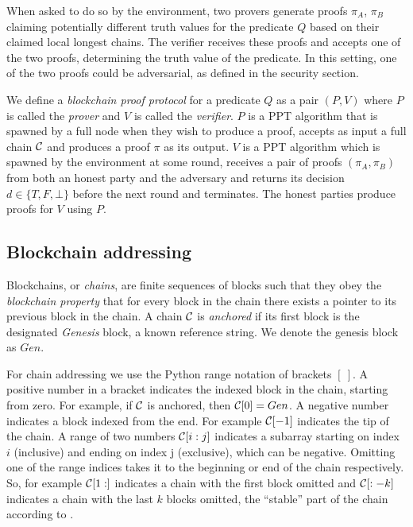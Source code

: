 When asked to do so by the environment, two provers generate proofs $\pi_A$,
$\pi_B$ claiming potentially different truth values for the predicate $Q$ based
on their claimed local longest chains. The verifier receives these proofs and
accepts one of the two proofs, determining the truth value of the predicate. In
this setting, one of the two proofs could be adversarial, as defined in the
security section.

We define a \textit{blockchain proof protocol} for a predicate $Q$ as a pair
$(P, V)$ where $P$ is called the \textit{prover} and $V$ is called the
\textit{verifier}. $P$ is a PPT algorithm that is spawned by a full node
when they wish to produce a proof, accepts as input a full chain $\mathcal{C}$ and
produces a proof $\pi$ as its output. $V$ is a PPT algorithm which is spawned
by the environment at some round, receives a pair of proofs $(\pi_A, \pi_B)$
from both an honest party and the adversary and returns its decision $d \in \{T,
F, \bot\}$ before the next round and terminates. The honest parties produce
proofs for $V$ using $P$.

\subsection{Blockchain addressing}

Blockchains, or \textit{chains}, are finite sequences of blocks such that they
obey the \textit{blockchain property} that for every block in the chain there
exists a pointer to its previous block in the chain. A chain $\mathcal{C}$ is
\textit{anchored} if its first block is the designated \textit{Genesis} block, a
known reference string. We denote the genesis block as $Gen$.

For chain addressing we use the Python range notation of brackets $[~]$. A
positive number in a bracket indicates the indexed block in the chain, starting
from zero. For example, if $\mathcal{C}$ is anchored, then $\mathcal{C}[0] = Gen$. A
negative number indicates a block indexed from the end.  For example
$\mathcal{C}[-1]$ indicates the tip of the chain. A range of two numbers
$\mathcal{C}[i:j]$ indicates a subarray starting on index $i$ (inclusive) and ending
on index j (exclusive), which can be negative. Omitting one of the range indices
takes it to the beginning or end of the chain respectively. So, for example
$\mathcal{C}[1:]$ indicates a chain with the first block omitted and $\mathcal{C}[:-k]$
indicates a chain with the last $k$ blocks omitted, the ``stable'' part of the
chain according to \cite{backbone}.

